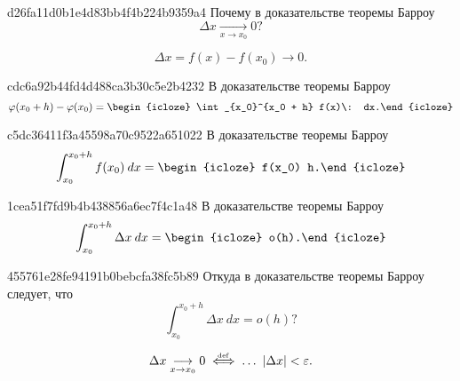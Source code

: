 \begin{note}{d26fa11d0b1e4d83bb4f4b224b9359a4}
    Почему в доказательстве теоремы Барроу
    \[
        \Delta  x \underset{x \to x_0}\longrightarrow 0?
    \]

    \begin{cloze}{1}
        \[
            \Delta x = f(x) - f(x_0) \to 0.
        \]
    \end{cloze}
\end{note}

\begin{note}{cdc6a92b44fd4d488ca3b30c5e2b4232}
    В доказательстве теоремы Барроу
    \[
        \varphi(x_0 + h) - \varphi(x_0) = \begin{icloze}{1}\int_{x_0}^{x_0 + h} f(x)\: dx.\end{icloze}
    \]
\end{note}

\begin{note}{c5dc36411f3a45598a70c9522a651022}
    В доказательстве теоремы Барроу
    \[
        \int_{x_0}^{x_0 + h} f(x_0)\: dx = \begin{icloze}{1}f(x_0) h.\end{icloze}
    \]
\end{note}

\begin{note}{1cea51f7fd9b4b438856a6ec7f4c1a48}
    В доказательстве  теоремы  Барроу
    \[
        \int_{x_0}^{x_0 + h} \Delta x\: dx = \begin{icloze}{1}o(h).\end{icloze}
    \]
\end{note}

\begin{note}{455761e28fe94191b0bebcfa38fc5b89}
    Откуда в доказательстве теоремы Барроу следует, что
    \[
        \int_{x_0}^{x_0 + h} \Delta x\: dx = o(h)?
    \]

    \begin{cloze}{1}
        \[
            \Delta x \underset{x \to x_0}\longrightarrow 0 \overset{\hspace{-1pt}\text{\tiny def}}\iff \dots \ \left\lvert \Delta x \right\rvert <  \varepsilon.
        \]
    \end{cloze}
\end{note}

